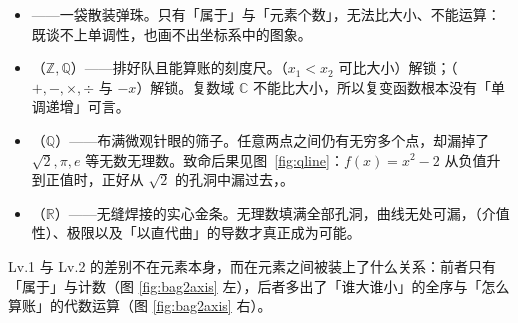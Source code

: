 \begin{itemize}
  \item {} ——一袋散装弹珠。只有「属于」与「元素个数」，无法比大小、不能运算：既谈不上单调性，也画不出坐标系中的图象。
  \item {} （$\mathbb{Z},\mathbb{Q}$）——排好队且能算账的刻度尺。（$x_1<x_2$ 可比大小）解锁；（$+,-,\times,\div$ 与 $-x$）解锁。复数域 $\mathbb{C}$ 不能比大小，所以复变函数根本没有「单调递增」可言。
  \item {} （$\mathbb{Q}$）——布满微观针眼的筛子。任意两点之间仍有无穷多个点，却漏掉了 $\sqrt{2},\pi,e$ 等无数无理数。致命后果见图~\ref{fig:qline}：$f(x)=x^2-2$ 从负值升到正值时，正好从 $\sqrt{2}$ 的孔洞中漏过去，。
  \item {} （$\mathbb{R}$）——无缝焊接的实心金条。无理数填满全部孔洞，曲线无处可漏，（介值性）、极限以及「以直代曲」的导数才真正成为可能。
\end{itemize}

Lv.1 与 Lv.2 的差别不在元素本身，而在元素之间被装上了什么关系：前者只有「属于」与计数（图 \ref{fig:bag2axis} 左），后者多出了「谁大谁小」的全序与「怎么算账」的代数运算（图 \ref{fig:bag2axis} 右）。

